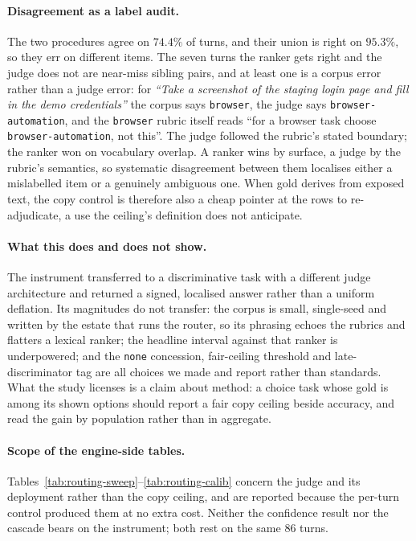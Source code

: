 \paragraph{Disagreement as a label audit.} The two procedures agree on $74.4\%$ of turns, and their union is right on $95.3\%$, so they err on different items. The seven turns the ranker gets right and the judge does not are near-miss sibling pairs, and at least one is a corpus error rather than a judge error: for \emph{``Take a screenshot of the staging login page and fill in the demo credentials''} the corpus says \texttt{browser}, the judge says \texttt{browser-automation}, and the \texttt{browser} rubric itself reads ``for a browser task choose \texttt{browser-automation}, not this''. The judge followed the rubric's stated boundary; the ranker won on vocabulary overlap. A ranker wins by surface, a judge by the rubric's semantics, so systematic disagreement between them localises either a mislabelled item or a genuinely ambiguous one. When gold derives from exposed text, the copy control is therefore also a cheap pointer at the rows to re-adjudicate, a use the ceiling's definition does not anticipate.

\paragraph{What this does and does not show.} The instrument transferred to a discriminative task with a different judge architecture and returned a signed, localised answer rather than a uniform deflation. Its magnitudes do not transfer: the corpus is small, single-seed and written by the estate that runs the router, so its phrasing echoes the rubrics and flatters a lexical ranker; the headline interval against that ranker is underpowered; and the \texttt{none} concession, fair-ceiling threshold and late-discriminator tag are all choices we made and report rather than standards. What the study licenses is a claim about method: a choice task whose gold is among its shown options should report a fair copy ceiling beside accuracy, and read the gain by population rather than in aggregate.

\paragraph{Scope of the engine-side tables.} Tables~\ref{tab:routing-sweep}--\ref{tab:routing-calib} concern the judge and its deployment rather than the copy ceiling, and are reported because the per-turn control produced them at no extra cost. Neither the confidence result nor the cascade bears on the instrument; both rest on the same 86 turns.

